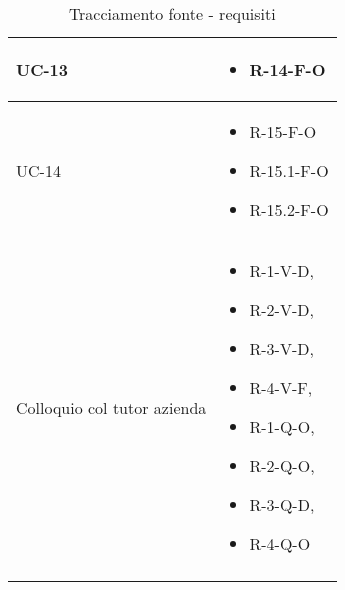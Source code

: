 \begin{center}
\begin{longtable}{| C{6cm} |C{6cm}|}
    UC-13 &
    \begin{itemize}
        \item R-14-F-O
    \end{itemize}\\\hline
    UC-14 &
    \begin{itemize}
        \item R-15-F-O
        \item R-15.1-F-O
        \item R-15.2-F-O
    \end{itemize}\\\hline
    Colloquio col tutor azienda &
    \begin{itemize}
        \item R-1-V-D,
        \item R-2-V-D,
        \item R-3-V-D,
        \item R-4-V-F,
        \item R-1-Q-O,
        \item R-2-Q-O,
        \item R-3-Q-D,
        \item R-4-Q-O
    \end{itemize} \\\hline
    \caption{Tracciamento fonte - requisiti}
    \end{longtable}
\end{center}


